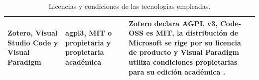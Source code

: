 \begin{table}[p]
\begin{tabularx}{\textwidth}{
            |>{\raggedright\arraybackslash}p{3.6cm}
            |>{\raggedright\arraybackslash}p{3.1cm}
            |>{\raggedright\arraybackslash}X|
        }
        Zotero, Visual Studio Code y Visual Paradigm
                                    & \gls{agpl3}, MIT o propietaria y propietaria académica
                                    & Zotero declara AGPL v3, Code-OSS es MIT, la distribución de Microsoft se rige por su licencia de producto y Visual Paradigm utiliza condiciones propietarias para su edición académica \cite{zoteroLicense2026,vscodeLicense2026,VisualParadigmLicensing}.                                                                                            \\ \hline
    \end{tabularx}
    \caption{Licencias y condiciones de las tecnologías empleadas.}
    \label{tab:licencias}
\end{table}

\FloatBarrier
